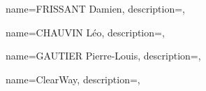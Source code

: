{
    name={FRISSANT Damien},
    description={},
}

{
    name={CHAUVIN Léo},
    description={},
}

{
    name={GAUTIER Pierre-Louis},
    description={},
}


{
    name={ClearWay},
    description={},
}
